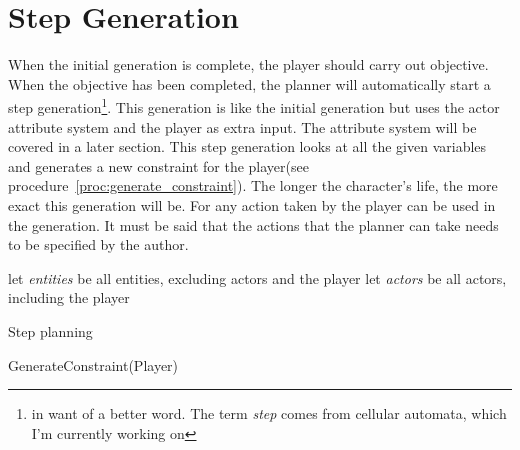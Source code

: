 \section{Step Generation}
When the initial generation is complete, the player should carry out \his objective. When the objective has been completed, the planner will automatically start a step generation\footnote{in want of a better word. The term \textit{step} comes from cellular automata, which I'm currently working on}. This generation is like the initial generation but uses the actor attribute system and the player as extra input. The attribute system will be covered in a later section. This step generation looks at all the given variables and generates a new constraint for the player(see procedure~\ref{proc:generate_constraint}). The longer the character's life, the more exact this generation will be. For any action taken by the player can be used in the generation. It must be said that the actions that the planner can take needs to be specified by the author. 
\begin{algorithm}
	let \textit{entities} be all entities, excluding actors and the player\;
	let \textit{actors} be all actors, including the player\;
	\caption{Step planning}\label{alg:step_planning}
\end{algorithm}
\begin{procedure}
	\caption{GenerateConstraint(Player)}\label{proc:generate_constraint}
\end{procedure}
